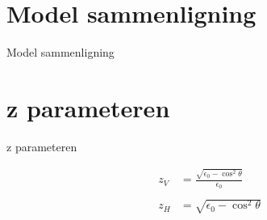 \section{Model sammenligning}
\begin{frame}{Model sammenligning}
\begin{minipage}{0.45\textwidth}
\resizebox{\textwidth}{!}{

}
\end{minipage}
\begin{minipage}{0.45\textwidth}
\resizebox{\textwidth}{!}{

}
\end{minipage}
\begin{minipage}{0.45\textwidth}
\resizebox{\textwidth}{!}{

}
\end{minipage}
\begin{minipage}{0.45\textwidth}

\end{minipage}

\end{frame}


\section{z parameteren}
\begin{frame}{z parameteren}
\begin{minipage}{0.35\textwidth}
\begin{align*}
z_V &= \frac{\sqrt{\epsilon_{0}-\cos^{2}\theta}}{\epsilon_{0}} \\
\\
z_H &= \sqrt{\epsilon_{0}-\cos^{2}\theta}
\end{align*}
\end{minipage}
\begin{minipage}{0.6\textwidth}
\resizebox{\textwidth}{!}{

}
\end{minipage}
\end{frame}


